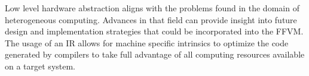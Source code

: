 Low level hardware abstraction aligns with the problems found in the domain of
heterogeneous computing. Advances in that field can provide insight into future
design and implementation strategies that could be incorporated into the FFVM.
The usage of an IR allows for machine specific intrinsics to optimize the code
generated by compilers to take full advantage of all computing resources
available on a target system.


